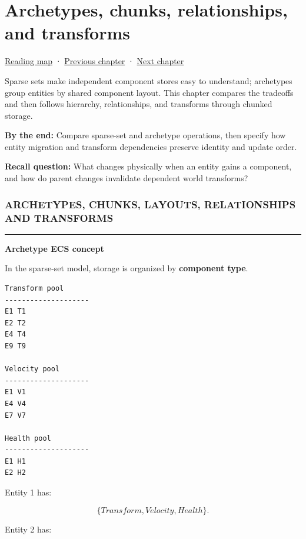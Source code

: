 \hypertarget{05-engine-i-ch016}{}
\chapter{Archetypes, chunks, relationships, and transforms}\label{05-engine-i-ch016-archetypes-chunks-relationships-and-transforms}

\hyperref[volume-reading-map]{Reading map} · \hyperref[05-engine-i-ch015-sparse-set-components-and-generational-entity-handles]{Previous chapter} · \hyperref[05-engine-i-ch017-ecs-performance-through-cache-and-scheduling]{Next chapter}

Sparse sets make independent component stores easy to understand; archetypes group entities by shared component layout. This chapter compares the tradeoffs and then follows hierarchy, relationships, and transforms through chunked storage.

\textbf{By the end:} Compare sparse-set and archetype operations, then specify how entity migration and transform dependencies preserve identity and update order.

\textbf{Recall question:} What changes physically when an entity gains a component, and how do parent changes invalidate dependent world transforms?

\subsection{ARCHETYPES, CHUNKS, LAYOUTS, RELATIONSHIPS AND TRANSFORMS}\label{05-engine-i-ch016-archetypes-chunks-layouts-relationships-and-transforms}

\begin{center}\rule{0.5\linewidth}{0.5pt}\end{center}

\textbf{Archetype ECS concept}

In the sparse-set model, storage is organized by \textbf{component type}.

\begin{verbatim}
Transform pool
--------------------
E1 T1
E2 T2
E4 T4
E9 T9

Velocity pool
--------------------
E1 V1
E4 V4
E7 V7

Health pool
--------------------
E1 H1
E2 H2
\end{verbatim}

Entity 1 has:

\[
\{Transform,Velocity,Health\}.
\]

Entity 2 has:

